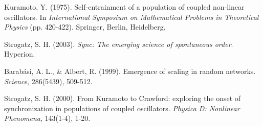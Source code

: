 \documentclass[12pt, a4paper]{article}
\begin{document}
\begin{thebibliography}{9}
    Kuramoto, Y. (1975). Self-entrainment of a population of coupled non-linear oscillators. In \textit{International Symposium on Mathematical Problems in Theoretical Physics} (pp. 420-422). Springer, Berlin, Heidelberg.
    
    Strogatz, S. H. (2003). \textit{Sync: The emerging science of spontaneous order}. Hyperion.

    Barabási, A. L., & Albert, R. (1999). Emergence of scaling in random networks. \textit{Science}, 286(5439), 509-512.
    
    Strogatz, S. H. (2000). From Kuramoto to Crawford: exploring the onset of synchronization in populations of coupled oscillators. \textit{Physica D: Nonlinear Phenomena}, 143(1-4), 1-20.

\end{thebibliography}
\end{document}
